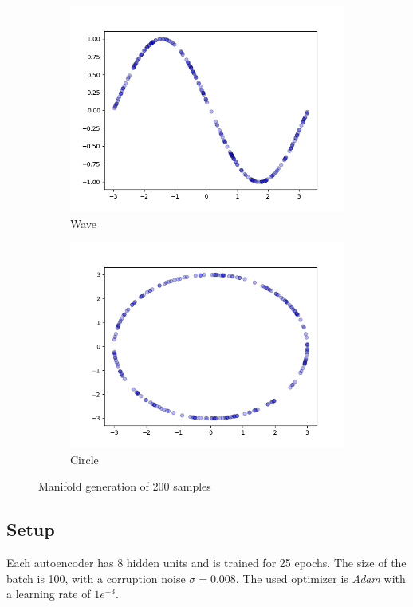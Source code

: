 \begin{figure}[!h]
\centering
\begin{subfigure}{.5\textwidth}
  \centering
  \includegraphics[width=.95\linewidth]{figures/wave-manifold}
  \caption{Wave}
\end{subfigure}%
\begin{subfigure}{.5\textwidth}
  \centering
  \includegraphics[width=.95\linewidth]{figures/circle-manifold}
  \caption{Circle}
\end{subfigure}
\caption{Manifold generation of 200 samples}
\label{fig:generate-manifold}
\end{figure}

\subsection*{Setup}
Each autoencoder has 8 hidden units and is trained for 25 epochs. The size of the batch is 100, with a corruption noise $\sigma = 0.008$. The used optimizer is \textit{Adam} \citep{kingma} with a learning rate of $1e^{-3}$.


